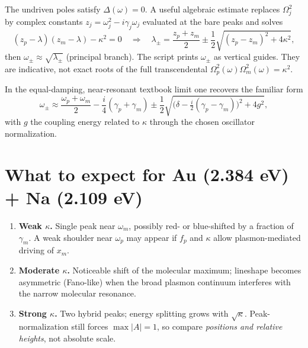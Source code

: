\documentclass[11pt,a4paper]{article}
\begin{document}
The undriven poles satisfy $\Delta(\omega)=0$.  A useful algebraic
estimate replaces $\Omega_j^2$ by complex constants
$z_j=\omega_j^2-i\gamma_j\omega_j$ evaluated at the bare peaks and solves
\begin{equation}
  (z_p-\lambda)(z_m-\lambda)-\kappa^2=0
  \quad\Rightarrow\quad
  \lambda_\pm
  =
  \frac{z_p+z_m}{2}
  \pm
  \frac12
  \sqrt{(z_p-z_m)^2+4\kappa^2},
\end{equation}
then $\omega_\pm\approx\sqrt{\lambda_\pm}$ (principal branch).  The
script prints $\omega_\pm$ as vertical guides.  They are indicative,
not exact roots of the full transcendental
$\Omega_p^2(\omega)\Omega_m^2(\omega)=\kappa^2$.

In the equal-damping, near-resonant textbook limit one recovers the
familiar form
\begin{equation}
  \omega_\pm
  \approx
  \frac{\omega_p+\omega_m}{2}
  -\frac{i}{4}(\gamma_p+\gamma_m)
  \pm
  \frac12
  \sqrt{
    \Big(
      \delta - \tfrac{i}{2}(\gamma_p-\gamma_m)
    \Big)^2
    + 4g^2
  },
\end{equation}
with $g$ the coupling energy related to $\kappa$ through the chosen
oscillator normalization.

\section{What to expect for Au (2.384 eV) + Na (2.109 eV)}

\begin{enumerate}[leftmargin=1.4em]
  \item \textbf{Weak $\kappa$.}
        Single peak near $\omega_m$, possibly red- or blue-shifted by a
        fraction of $\gamma_m$.  A weak shoulder near $\omega_p$ may
        appear if $f_p$ and $\kappa$ allow plasmon-mediated driving of
        $x_m$.
  \item \textbf{Moderate $\kappa$.}
        Noticeable shift of the molecular maximum; lineshape becomes
        asymmetric (Fano-like) when the broad plasmon continuum
        interferes with the narrow molecular resonance.
  \item \textbf{Strong $\kappa$.}
        Two hybrid peaks; energy splitting grows with $\sqrt{\kappa}$.
        Peak-normalization still forces $\max|A|=1$, so compare
        \emph{positions and relative heights}, not absolute scale.
\end{enumerate}
\end{document}
